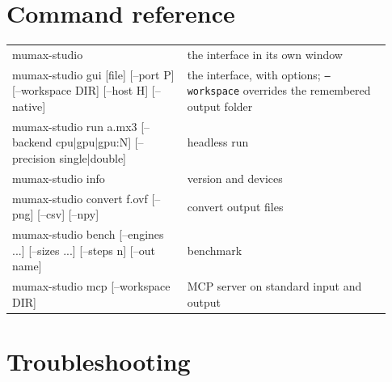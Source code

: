 \documentclass[11pt,a4paper,oneside]{book}
\newcommand{\code}[1]{\texttt{#1}}
\renewcommand{\_}{\textunderscore\allowbreak}
\begin{document}
\chapter{Command reference}

\begin{center}
\begin{tabular}{>{\ttfamily}p{0.43\linewidth} p{0.5\linewidth}}
\toprule
mumax-studio & the interface in its own window \\
mumax-studio gui [file] [--port P] [--workspace DIR] [--host H] [--native] & the interface, with options;
\code{--workspace} overrides the remembered output folder \\
mumax-studio run a.mx3 [--backend cpu|gpu|gpu:N] [--precision single|double] & headless run \\
mumax-studio info & version and devices \\
mumax-studio convert f.ovf [--png] [--csv] [--npy] & convert output files \\
mumax-studio bench [--engines ...] [--sizes ...] [--steps n] [--out name] & benchmark \\
mumax-studio mcp [--workspace DIR] & MCP server on standard input and output \\
\bottomrule
\end{tabular}
\end{center}

\chapter{Troubleshooting}
\end{document}
